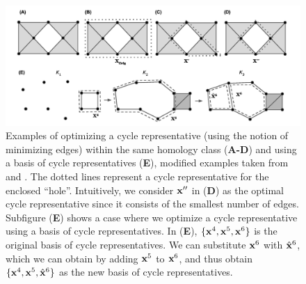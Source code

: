 \begin{figure}[h!]
\begin{center}
\includegraphics[width=1\textwidth]{figures/examples.jpg} 
\end{center}
\caption{Examples of optimizing a cycle representative (using the notion of minimizing edges) within the same homology class (\textbf{A-D}) and using a basis of cycle representatives (\textbf{E}), modified examples taken from \cite{Escolar2016} and \cite{Obayashi2018}. The dotted lines represent a cycle representative for the enclosed ``hole''. Intuitively, we consider $\mathbf{x}''$ in (\textbf{D}) as the optimal cycle representative since it consists of the smallest number of edges. Subfigure (\textbf{E}) shows a case where we optimize a cycle representative using a basis of cycle representatives. In (\textbf{E}), $\{\mathbf{x}^4, \mathbf{x}^5, \mathbf{x}^6\}$ is the original basis of cycle representatives. We can substitute $\mathbf{x}^6$ with $\hat{\mathbf{x}}^6$, which we can obtain by adding $\mathbf{x}^5$ to $\mathbf{x}^6$, and thus obtain $\{\mathbf{x}^4, \mathbf{x}^5, \hat{\mathbf{x}}^6\}$ as the new basis of cycle representatives.}\label{fig:example-optimal}
\end{figure}


